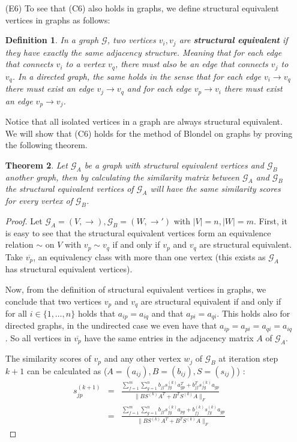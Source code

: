 \documentclass[a4paper,11pt]{report}
\newtheorem{theorem}{Theorem}[section]
\newtheorem{definition}[theorem]{Definition}
\newcommand{\graf}{\mathscr{G}}
\begin{document}
\begin{itemize}
  \item[(E6)]  To see that (C6) also holds in graphs, we define structural equivalent vertices in graphs 
  as follows:

    \begin{definition} In a graph $\graf$, two vertices $v_i, v_j$ are \textbf{structural equivalent} if they have exactly the same 
  adjacency structure. Meaning that for each edge that connects $v_i$ to a vertex $v_q$, there must also 
  be an edge that connects $v_j$ to $v_q$.  In a directed graph, the same holds 
  in the sense that for each edge $v_i \to v_q$ there must exist an edge $v_j \to v_q$ 
  and for each edge $v_p \to v_i$ there must exist an edge $v_p \to v_j$.
  \end{definition}
 Notice that all isolated vertices in a graph are always 
  structural equivalent. We will show that (C6) holds for the method of Blondel on graphs by proving the 
  following theorem. 
 \begin{theorem}
    Let $\graf_A$ be a graph with structural equivalent vertices and $\graf_B$ another 
    graph, then by calculating the similarity matrix between $\graf_A$ and 
    $\graf_B$ the structural equivalent vertices of $\graf_A$ will have the same similarity scores for every vertex of $\graf_B$. 
  \end{theorem}
  \begin{proof}
    Let $\graf_A = (V,\to), \graf_B = (W,\to')$ with $|V|=n, |W|=m$. First, it is easy to see that the structural equivalent vertices form an equivalence relation $\sim$ on 
    $V$ with $v_p \sim v_q$ if and only if $v_p$ and $v_q$ are structural equivalent. 
    Take $\overline{v_p}$, an equivalency class with more than one vertex (this exists as $\graf_A$ has structural equivalent 
    vertices).  
    
    Now, from the definition of structural equivalent vertices in graphs, we conclude 
    that two vertices $v_p$ and $v_q$ are structural equivalent if and only if for all $i \in \{1,\ldots,n\}$ 
    holds that $a_{ip} = a_{iq}$ and 
    that $a_{pi} = a_{qi}$. This holds also for directed graphs, in the 
    undirected case we even have that $a_{ip} = a_{pi} = a_{qi} = a_{iq}$. So 
    all vertices in $\overline{v_p}$ have the same entries in the adjacency matrix $A$ of $\graf_A$. 
    
    
   The similarity scores of $v_p$ and any other vertex $w_j$  of 
    $\graf_B$ at iteration step $k+1$ can be calculated as ($A = (a_{ij}), B=(b_{ij}), S=(s_{ij})$) :
    \begin{eqnarray}
      s^{(k+1)}_{jp} &=& \frac{\sum^m_{f=1}\sum^n_{g=1} b_{jf}s^{(k)}_{fg}a^T_{gp} + 
    b^T_{jf}s^{(k)}_{fg}a_{gp} }{\|BS^{(k)}A^T + B^TS^{(k)}A\|_F}\\
    &=& \frac{\sum^m_{f=1}\sum^n_{g=1} b_{jf}s^{(k)}_{fg}a_{pg} + 
    b_{fj}^{(k)}s^{(k)}_{fg}a_{gp} }{\|BS^{(k)}A^T + B^TS^{(k)}A\|_F}\label{uitgeschrevenblondel2}
    \end{eqnarray}
   

\end{proof}
\end{itemize}
\end{document}
